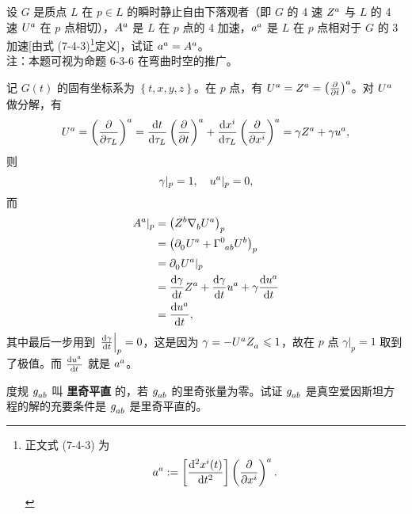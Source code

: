 \begin{xiti}
	\item 设 $G$ 是质点 $L$ 在 $p\in L$ 的瞬时静止自由下落观者（即 $G$ 的 4 速 $\tensor{Z}{^a}$ 与 $L$ 的 4 速 $\tensor{U}{^a}$ 在 $p$ 点相切），$\tensor{A}{^a}	$ 是 $L$ 在 $p$ 点的 4 加速，$\tensor{a}{^a}	$ 是 $L$ 在 $p$ 点相对于 $G$ 的 3 加速[由式 (7-4-3)\footnote{正文式 (7-4-3) 为
	\begin{equation*}
		\tensor{a}{^a} := \left[ \dv[2]{x^i(t)}{t} \right] \tensor{\left( \pdv{x^i} \right)}{^a}.
	\end{equation*}}定义]，试证 $\tensor{a}{^a} = \tensor{A}{^a}$。\\
	注：本题可视为命题 6-3-6 在弯曲时空的推广。

		\begin{zm}
			记 $G(t)$ 的固有坐标系为 $\left\{ t,x,y,z \right\}$。在 $p$ 点，有 $\tensor{U}{^a} = \tensor{Z}{^a} = \tensor{\left( \pdv{t} \right)}{^a}$。对 $\tensor{U}{^a}$ 做分解，有
			\begin{equation*}
				\tensor{U}{^a} = \tensor{\left( \pdv{\tau_L} \right)}{^a} = \dv{t}{\tau_L} \tensor{\left( \pdv{t} \right)}{^a} + \dv{x^i}{\tau_L} \tensor{\left( \pdv{x^i} \right)}{^a} = \gamma \tensor{Z}{^a} + \gamma \tensor{u}{^a},
			\end{equation*}
			则
			\begin{equation*}
				\gamma|_p = 1 \qc \tensor{u}{^a}|_{p} = 0,
			\end{equation*}
			而
			\begin{equation*}
				\begin{split}
					\tensor{A}{^a}|_p &= \left( \tensor{Z}{^b} \Nabla{b} \tensor{U}{^a} \right)_p\\
					&= \left( \Partial{0} \tensor{U}{^a} + \ChristoffelSymbol{0}{a}{b} \tensor{U}{^b} \right)_p\\
					&= \Partial{0} \tensor{U}{^a} |_p\\
					&= \dv{\gamma}{t} \tensor{Z}{^a} + \dv{\gamma}{t} \tensor{u}{^a} + \gamma \dv{\tensor{u}{^a}}{t}\\
					&= \dv{\tensor{u}{^a}}{t},
				\end{split}
			\end{equation*}
			其中最后一步用到 $\left.\dv{\gamma}{t}\right|_p = 0$，这是因为 $\gamma = - \tensor{U}{^a} \tensor{Z}{_a} \leqslant 1$，故在 $p$ 点 $\gamma|_p=1$ 取到了极值。而 $\dv{\tensor{u}{^a}}{t}$ 就是 $\tensor{a}{^a}$。
		\end{zm}

	\item 度规 $\tensor{g}{_a_b}$ 叫 \textbf{里奇平直} 的，若 $\tensor{g}{_a_b}$ 的里奇张量为零。试证 $\tensor{g}{_a_b}$ 是真空爱因斯坦方程的解的充要条件是 $\tensor{g}{_a_b}$ 是里奇平直的。
	

\end{xiti}
